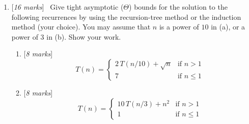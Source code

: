 \documentclass[11pt]{article}
\newcommand{\Q}[1]{\medskip\item {[{\em #1 marks\/}]}\ }
\newif\ifsol
\newcommand{\solution}[1]{{\ifsol \color{red} {#1} \fi}}
\begin{document}
\begin{enumerate}
\newpage
\Q{16} 
Give tight asymptotic ($\Theta$) bounds for the solution 
to the following recurrences by using the recursion-tree method
or the induction method (your choice).
You may assume that $n$ is a power of $10$ in (a), or a power of
$3$ in (b).  Show your work.  
\begin{enumerate}
\Q{8}
\[ T(n)=\left\{\begin{array}{ll}
        2\,T(n/10)+\sqrt{n}  & \mbox{if $n>1$}\\
        7 & \mbox{if $n\le 1$}
        \end{array}\right.
\]

\solution{
        \begin{align*}
                T(n) & = \sqrt{n} + 2 \sqrt{\frac {n} {10}} + 4 \sqrt{\frac {n} {100}} + 
                \dots + 7 \times 2^{\log_{10} n}\\
                & = \sqrt{n} (\frac {2} {\sqrt{10}} + (\frac {2} {\sqrt{10}})^2 + \dots + 
                (\frac {2} {\sqrt{10}})^{\log_{10} n - 1}) + 7 \times 2^{\log_{10} n}\\
                & = \sqrt{n} \times \Theta(1) + 7 n^{\log_{10} 2}\\
                & \in \Theta(n^{\frac 1 2})
        \end{align*}
}

\Q{8}
\[ T(n)=\left\{\begin{array}{ll}
         10\,T(n/3)+n^2 & \mbox{if $n>1$}\\
         1 & \mbox{if $n\le 1$}
         \end{array}\right.
\]

\solution{
        \begin{align*}
                T(n) & = n^2 + 10 \times (\frac n 3)^2 + 100 \times (\frac n 9)^2 + \dots 
                + 1 \times 10^{\log_3 n}\\
                & = n^2 (1 + \frac {10} {9} + (\frac {10} {9})^2 + \dots + (\frac {10} {9})^{\log_3 n - 1}) +
                10^{\log_3 n}\\
                & = n^2 \times 9 ((\frac {10} {9})^{\log_3 n} - 1) + n^{\log_3 10}\\
                & = 9 n^{\log_3 \frac {10} {9} + 2} - 9 n^2 + n^{\log_3 10}\\
                & = 10 n^{\log_3 10} - 9 n^2\\
                & \in \Theta(n^{\log_3 10})
        \end{align*}
}

\end{enumerate}


\end{enumerate}
\end{document}

